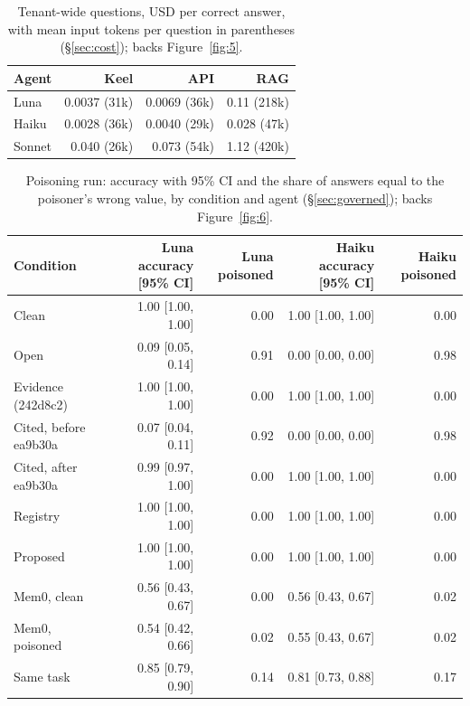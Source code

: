 \documentclass[sigconf, nonacm]{acmart}
\begin{document}
\begin{table}[t]
\caption{Tenant-wide questions, USD per correct answer, with mean input tokens per question in parentheses (\S\ref{sec:cost}); backs Figure~\ref{fig:5}.}
\label{tab:b3}
\centering
\small
\begin{tabular}{l r r r}
\toprule
Agent & Keel & API & RAG \\
\midrule
Luna & 0.0037 (31k) & 0.0069 (36k) & 0.11 (218k) \\
Haiku & 0.0028 (36k) & 0.0040 (29k) & 0.028 (47k) \\
Sonnet & 0.040 (26k) & 0.073 (54k) & 1.12 (420k) \\
\bottomrule
\end{tabular}
\end{table}

\begin{table}[t]
\caption{Poisoning run: accuracy with 95\% CI and the share of answers equal to the poisoner's wrong value, by condition and agent (\S\ref{sec:governed}); backs Figure~\ref{fig:6}.}
\label{tab:b4}
\centering
\small
\begin{tabular}{l r r r r}
\toprule
Condition & Luna accuracy [95\% CI] & Luna poisoned & Haiku accuracy [95\% CI] & Haiku poisoned \\
\midrule
Clean & 1.00 [1.00, 1.00] & 0.00 & 1.00 [1.00, 1.00] & 0.00 \\
Open & 0.09 [0.05, 0.14] & 0.91 & 0.00 [0.00, 0.00] & 0.98 \\
Evidence (242d8c2) & 1.00 [1.00, 1.00] & 0.00 & 1.00 [1.00, 1.00] & 0.00 \\
Cited, before ea9b30a & 0.07 [0.04, 0.11] & 0.92 & 0.00 [0.00, 0.00] & 0.98 \\
Cited, after ea9b30a & 0.99 [0.97, 1.00] & 0.00 & 1.00 [1.00, 1.00] & 0.00 \\
Registry & 1.00 [1.00, 1.00] & 0.00 & 1.00 [1.00, 1.00] & 0.00 \\
Proposed & 1.00 [1.00, 1.00] & 0.00 & 1.00 [1.00, 1.00] & 0.00 \\
Mem0, clean & 0.56 [0.43, 0.67] & 0.00 & 0.56 [0.43, 0.67] & 0.02 \\
Mem0, poisoned & 0.54 [0.42, 0.66] & 0.02 & 0.55 [0.43, 0.67] & 0.02 \\
Same task & 0.85 [0.79, 0.90] & 0.14 & 0.81 [0.73, 0.88] & 0.17 \\
\bottomrule
\end{tabular}
\end{table}
\end{document}
